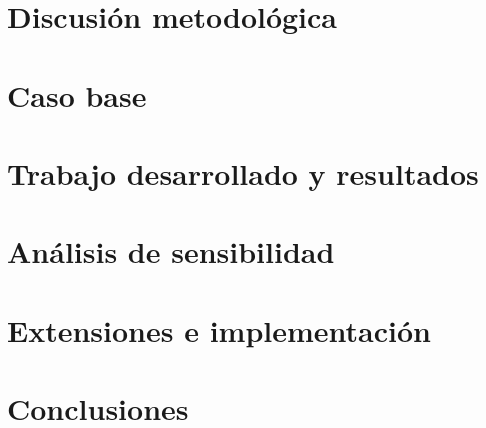 \documentclass[pdftex]{pucthesis}
\begin{document}
\chapter[DISCUSIÓN METODOLÓGICA]{Discusión metodológica}\label{cap:metodologia}


\chapter[CASO BASE]{Caso base}\label{cap:casobase}


\chapter[TRABAJO DESARROLLADO Y RESULTADOS]{Trabajo desarrollado y resultados}\label{cap:trabajo}


\chapter[ANÁLISIS DE SENSIBILIDAD]{Análisis de sensibilidad}\label{cap:sensibilidad}



\chapter[EXTENSIONES E IMPLEMENTACIÓN]{Extensiones e implementación}\label{cap:implementacion}


\chapter[CONCLUSIONES]{Conclusiones}\label{cap:conclusiones}


\cleardoublepage
{}

\renewcommand{\bibname}{BIBLIOGRAFÍA}


\clearpage
\renewcommand{\appendixname}{APÉNDICE}
\appendix
\renewcommand{\theHfigure}{apendice.\Alph{figure}}

\end{document}
